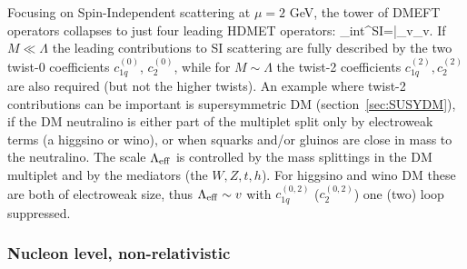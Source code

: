 Focusing on Spin-Independent scattering at $\mu=2$ GeV, the tower of DMEFT operators collapses to just four leading HDMET operators: 
\beq
{\Lag}_{\rm int}^{\rm SI}=\bar \chi_v\chi_v.
\eeq
If $M\ll \Lambda$ the leading contributions to SI scattering are fully described by the two twist-0 coefficients  $c_{1q}^{(0)}$, $c_{2}^{(0)}$, 
while for $M\sim \Lambda$ the twist-2  coefficients $c_{1q}^{(2)}, c_{2}^{(2)}$ are also required (but not the higher twists). 
An example where twist-2 contributions can be important is supersymmetric DM (section~\ref{sec:SUSYDM}),
if the DM neutralino is either part of the multiplet split only by electroweak terms
(a higgsino or wino), or when squarks and/or gluinos are close in mass to the neutralino. 
The scale $\Lambda_{\rm eff}$ is controlled by the mass splittings in the DM multiplet
and by the mediators (the $W,Z,t,h$).
For higgsino and wino DM these are both of electroweak size,
thus $\Lambda_{\rm eff} \sim v$ with $c_{1q}^{(0,2)}$ 
($c_{2}^{(0,2)}$) one (two) loop suppressed.



\subsubsection*{Nucleon level, non-relativistic}  

